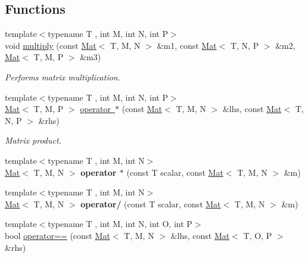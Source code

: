 \subsection*{Functions}
\begin{DoxyCompactItemize}
\item 
{\footnotesize template$<$typename T , int M, int N, int P$>$ }\\void \mbox{\hyperlink{namespacetao_ab38f346af660c21af2f77045cd9d1dad}{multiply}} (const \mbox{\hyperlink{classtao_1_1_mat}{Mat}}$<$ T, M, N $>$ \&m1, const \mbox{\hyperlink{classtao_1_1_mat}{Mat}}$<$ T, N, P $>$ \&m2, \mbox{\hyperlink{classtao_1_1_mat}{Mat}}$<$ T, M, P $>$ \&m3)
\begin{DoxyCompactList}\small\item\em Performs matrix multiplication. \end{DoxyCompactList}\item 
{\footnotesize template$<$typename T , int M, int N, int P$>$ }\\\mbox{\hyperlink{classtao_1_1_mat}{Mat}}$<$ T, M, P $>$ \mbox{\hyperlink{namespacetao_a8ed9b8556b4fa9f623903552fe9240de}{operator $\ast$}} (const \mbox{\hyperlink{classtao_1_1_mat}{Mat}}$<$ T, M, N $>$ \&lhs, const \mbox{\hyperlink{classtao_1_1_mat}{Mat}}$<$ T, N, P $>$ \&rhs)
\begin{DoxyCompactList}\small\item\em Matrix product. \end{DoxyCompactList}\item 
\mbox{\label{namespacetao_aaa5901f79ec6997d9bfd85a7454dec1e}} 
{\footnotesize template$<$typename T , int M, int N$>$ }\\\mbox{\hyperlink{classtao_1_1_mat}{Mat}}$<$ T, M, N $>$ {\bfseries operator $\ast$} (const T scalar, const \mbox{\hyperlink{classtao_1_1_mat}{Mat}}$<$ T, M, N $>$ \&m)
\item 
\mbox{\label{namespacetao_a0af0c8a4e04e8e95f40353d07ab6b2df}} 
{\footnotesize template$<$typename T , int M, int N$>$ }\\\mbox{\hyperlink{classtao_1_1_mat}{Mat}}$<$ T, M, N $>$ {\bfseries operator/} (const T scalar, const \mbox{\hyperlink{classtao_1_1_mat}{Mat}}$<$ T, M, N $>$ \&m)
\item 
{\footnotesize template$<$typename T , int M, int N, int O, int P$>$ }\\bool \mbox{\hyperlink{namespacetao_a00596468f8e90608840017e4619e0bb7}{operator==}} (const \mbox{\hyperlink{classtao_1_1_mat}{Mat}}$<$ T, M, N $>$ \&lhs, const \mbox{\hyperlink{classtao_1_1_mat}{Mat}}$<$ T, O, P $>$ \&rhs)

\end{DoxyCompactItemize}

